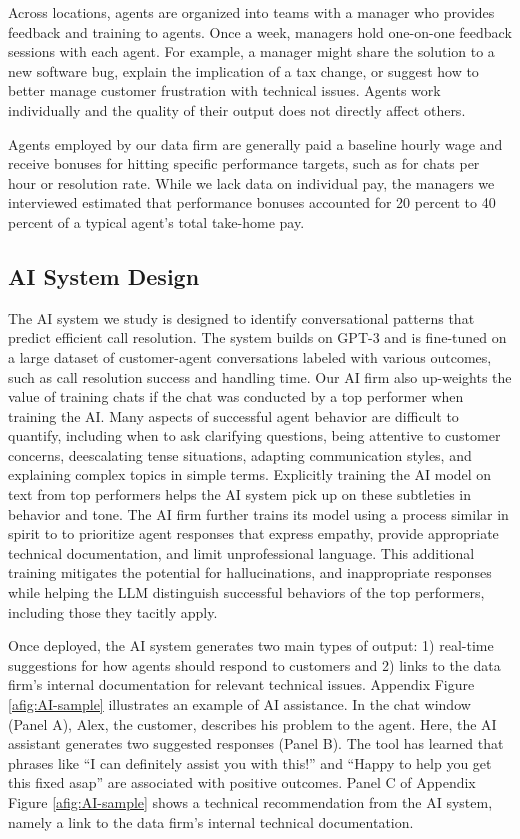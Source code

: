 \documentclass[11pt]{article}
\begin{document}
Across locations, agents are organized into teams with a manager who provides feedback and training to agents. Once a week, managers hold one-on-one feedback sessions with each agent. For example, a manager might share the solution to a new software bug, explain the implication of a tax change, or suggest how to better manage customer frustration with technical issues. Agents work individually and the quality of their output does not directly affect others. 

Agents employed by our data firm are generally paid a baseline hourly wage and receive bonuses for hitting specific performance targets, such as for chats per hour or resolution rate. While we lack data on individual pay, the managers we interviewed estimated that performance bonuses accounted for 20 percent to 40 percent of a typical agent's total take-home pay.


\subsection{AI System Design}

The AI system we study is designed to identify conversational patterns that predict efficient call resolution. The system builds on GPT-3 and is fine-tuned on a large dataset of customer-agent conversations labeled with various outcomes, such as call resolution success and handling time.  Our AI firm also up-weights the value of training chats if the chat was conducted by a top performer when training the AI.  Many aspects of successful agent behavior are difficult to quantify, including when to ask clarifying questions, being attentive to customer concerns, deescalating tense situations, adapting communication styles, and explaining complex topics in simple terms.  Explicitly training the AI model on text from top performers helps the AI system pick up on these subtleties in behavior and tone. The AI firm further trains its model using a process similar in spirit to \citet{ouyangTrainingLanguageModels2022} to prioritize agent responses that express empathy, provide appropriate technical documentation, and limit unprofessional language.  This additional training mitigates the potential for hallucinations, and inappropriate responses while helping the LLM distinguish successful behaviors of the top performers, including those they tacitly apply. 

Once deployed, the AI system generates two main types of output: 1) real-time suggestions for how agents should respond to customers and 2) links to the data firm's internal documentation for relevant technical issues. Appendix Figure \ref{afig:AI-sample} illustrates an example of AI assistance. In the chat window (Panel A), Alex, the customer, describes his problem to the agent.  Here, the AI assistant generates two suggested responses (Panel B). The tool has learned that phrases like ``I can definitely assist you with this!'' and ``Happy to help you get this fixed asap'' are associated with positive outcomes. Panel C of Appendix Figure \ref{afig:AI-sample} shows a technical recommendation from the AI system, namely a link to the data firm's internal technical documentation.
\end{document}
